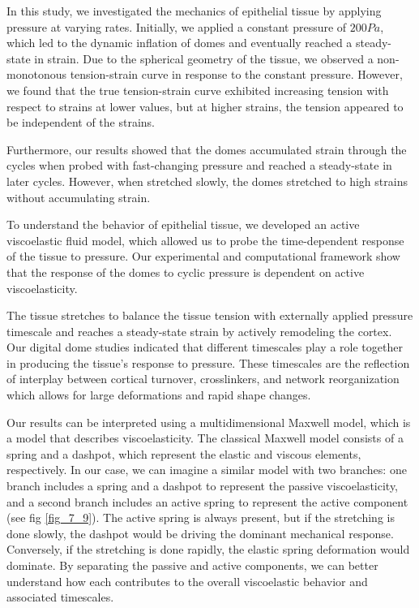 In this study, we investigated the mechanics of epithelial tissue by applying pressure at varying rates. Initially, we applied a constant pressure of $200Pa$, which led to the dynamic inflation of domes and eventually reached a steady-state in strain. Due to the spherical geometry of the tissue, we observed a non-monotonous tension-strain curve in response to the constant pressure. However, we found that the true tension-strain curve exhibited increasing tension with respect to strains at lower values, but at higher strains, the tension appeared to be independent of the strains.

Furthermore, our results showed that the domes accumulated strain through the cycles when probed with fast-changing pressure and reached a steady-state in later cycles. However, when stretched slowly, the domes stretched to high strains without accumulating strain.

To understand the behavior of epithelial tissue, we developed an active viscoelastic fluid model, which allowed us to probe the time-dependent response of the tissue to pressure. Our experimental and computational framework show that the response of the domes to cyclic pressure is dependent on active viscoelasticity.

The tissue stretches to balance the tissue tension with externally applied pressure timescale and reaches a steady-state strain by actively remodeling the cortex. Our digital dome studies indicated that different timescales play a role together in producing the tissue's response to pressure. These timescales are the reflection of  interplay between cortical turnover, crosslinkers, and network reorganization which allows for large deformations and rapid shape changes.

Our results can be interpreted using a multidimensional Maxwell model, which is a model that describes viscoelasticity. The classical Maxwell model consists of a spring and a dashpot, which represent the elastic and viscous elements, respectively. In our case, we can imagine a similar model with two branches: one branch includes a spring and a dashpot to represent the passive viscoelasticity, and a second branch includes an active spring to represent the active component (see fig \ref{fig_7_9}). The active spring is always present, but if the stretching is done slowly, the dashpot would be driving the dominant mechanical response. Conversely, if the stretching is done rapidly, the elastic spring deformation would dominate. By separating the passive and active components, we can better understand how each contributes to the overall viscoelastic behavior and associated timescales.

